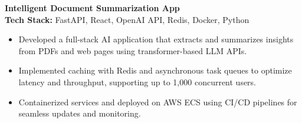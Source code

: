 \documentclass[letterpaper,10.5pt]{article}
\begin{document}
\textbf{Intelligent Document Summarization App} \hfill \\
\textbf{Tech Stack:} FastAPI, React, OpenAI API, Redis, Docker, Python
\begin{itemize}\itemsep 1pt
  \item Developed a full-stack AI application that extracts and summarizes insights from PDFs and web pages using transformer-based LLM APIs.
  \item Implemented caching with Redis and asynchronous task queues to optimize latency and throughput, supporting up to 1,000 concurrent users.
  \item Containerized services and deployed on AWS ECS using CI/CD pipelines for seamless updates and monitoring.
\end{itemize}
\end{document}
